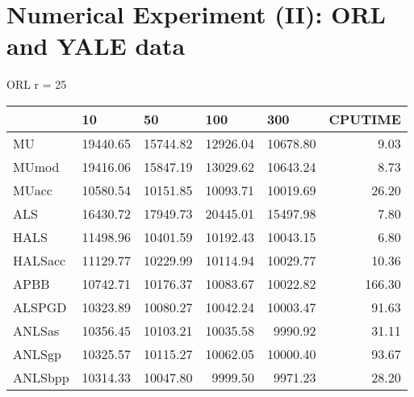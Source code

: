 \documentclass{article}
\begin{document}
\section{Numerical Experiment (II): ORL and YALE data}
ORL r = 25
\begin{table}[H]
	\centering
	\begin{tabular}{|l|r|r|r|r|r|}
		\hline
		& \multicolumn{1}{l|}{10} & \multicolumn{1}{l|}{50} & \multicolumn{1}{l|}{100} & \multicolumn{1}{l|}{300} & \multicolumn{1}{l|}{CPUTIME} \\ \hline
		MU       & 19440.65                & 15744.82                & 12926.04                 & 10678.80                 & 9.03                         \\ \hline
		MUmod    & 19416.06                & 15847.19                & 13029.62                 & 10643.24                 & 8.73                         \\ \hline
		MUacc    & 10580.54                & 10151.85                & 10093.71                 & 10019.69                 & 26.20                        \\ \hline
		ALS      & 16430.72                & 17949.73                & 20445.01                 & 15497.98                 & 7.80                         \\ \hline
		HALS     & 11498.96                & 10401.59                & 10192.43                 & 10043.15                 & 6.80                         \\ \hline
		HALSacc  & 11129.77                & 10229.99                & 10114.94                 & 10029.77                 & 10.36                        \\ \hline
		APBB     & 10742.71                & 10176.37                & 10083.67                 & 10022.82                 & 166.30                       \\ \hline
		ALSPGD   & 10323.89                & 10080.27                & 10042.24                 & 10003.47                 & 91.63                        \\ \hline
		ANLSas   & 10356.45                & 10103.21                & 10035.58                 & 9990.92                  & 31.11                        \\ \hline
		ANLSgp   & 10325.57                & 10115.27                & 10062.05                 & 10000.40                 & 93.67                        \\ \hline
		ANLSbpp  & 10314.33                & 10047.80                & 9999.50                  & 9971.23                  & 28.20                        \\ \hline

\end{tabular}
\end{table}
\end{document}

